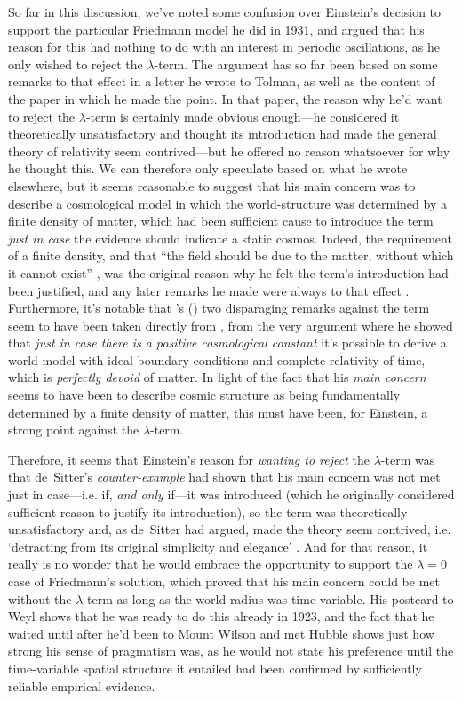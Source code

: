 \documentclass[12 pt]{article}
\def\citeapos#1{\citeauthor{#1}'s (\citeyear{#1})}
\begin{document}
So far in this discussion, we've noted some confusion over Einstein's decision to support the particular Friedmann model he did in 1931, and argued that his reason for this had nothing to do with an interest in periodic oscillations, as he only wished to reject the $\lambda$-term. The argument has so far been based on some remarks to that effect in a letter he wrote to Tolman, as well as the content of the paper in which he made the point. In that paper, the reason why he'd want to reject the $\lambda$-term is certainly made obvious enough---he considered it theoretically unsatisfactory and thought its introduction had made the general theory of relativity seem contrived---but he offered no reason whatsoever for why he thought this. We can therefore only speculate based on what he wrote elsewhere, but it seems reasonable to suggest that his main concern was to describe a cosmological model in which the world-structure was determined by a finite density of matter, which had been sufficient cause to introduce the term \textit{just in case} the evidence should indicate a static cosmos. Indeed, the requirement of a finite density, and that ``the field should be due to the matter, without which it cannot exist'' \citep{deSitter1917a}, was the original reason why he felt the term's introduction had been justified, and any later remarks he made were always to that effect \citep[p.~685]{Einstein1932,Einstein1945,Einstein1949}. Furthermore, it's notable that \citeapos{Einstein1931a} two disparaging remarks against the term seem to have been taken directly from \citet{deSitter1917a}, from the very argument where he showed that \textit{just in case there is a positive cosmological constant} it's possible to derive a world model with ideal boundary conditions and complete relativity of time, which is \textit{perfectly devoid} of matter. In light of the fact that his \textit{main concern} seems to have been to describe cosmic structure as being fundamentally determined by a finite density of matter, this must have been, for Einstein, a strong point against the $\lambda$-term.

Therefore, it seems that Einstein's reason for \textit{wanting to reject} the $\lambda$-term was that de~Sitter's \textit{counter-example} had shown that his main concern was not met just in case---i.e. if, \textit{and only} if---it was introduced (which he originally considered sufficient reason to justify its introduction), so the term was theoretically unsatisfactory and, as de~Sitter had argued, made the theory seem contrived, i.e. `detracting from its original simplicity and elegance' \citep{deSitter1917b}. And for that reason, it really is no wonder that he would embrace the opportunity to support the $\lambda=0$ case of Friedmann's solution, which proved that his main concern could be met without the $\lambda$-term as long as the world-radius was time-variable. His postcard to Weyl \citep{Einstein1923b} shows that he was ready to do this already in 1923, and the fact that he waited until after he'd been to Mount Wilson and met Hubble shows just how strong his sense of pragmatism was, as he would not state his preference until the time-variable spatial structure it entailed had been confirmed by sufficiently reliable empirical evidence. 
\end{document}
